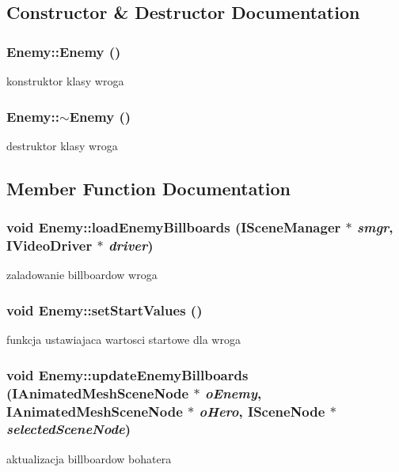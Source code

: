 \subsection{Constructor \& Destructor Documentation}
\hypertarget{class_enemy_a94f30d348b6d2840fd71675472ba38dd}{
\subsubsection[{Enemy}]{\setlength{\rightskip}{0pt plus 5cm}Enemy::Enemy ()}}
\label{class_enemy_a94f30d348b6d2840fd71675472ba38dd}
konstruktor klasy wroga \hypertarget{class_enemy_ac0eec4755e28c02688065f9657150ac3}{
\subsubsection[{$\sim$Enemy}]{\setlength{\rightskip}{0pt plus 5cm}Enemy::$\sim$Enemy ()}}
\label{class_enemy_ac0eec4755e28c02688065f9657150ac3}
destruktor klasy wroga 

\subsection{Member Function Documentation}
\hypertarget{class_enemy_a0ab9508df2fd67274909f58eb45bfe1d}{
\subsubsection[{loadEnemyBillboards}]{\setlength{\rightskip}{0pt plus 5cm}void Enemy::loadEnemyBillboards (ISceneManager $\ast$ {\em smgr}, \/  IVideoDriver $\ast$ {\em driver})}}
\label{class_enemy_a0ab9508df2fd67274909f58eb45bfe1d}
zaladowanie billboardow wroga \hypertarget{class_enemy_aadb12aa34b916fa9545f00c2000cbb89}{
\subsubsection[{setStartValues}]{\setlength{\rightskip}{0pt plus 5cm}void Enemy::setStartValues ()}}
\label{class_enemy_aadb12aa34b916fa9545f00c2000cbb89}
funkcja ustawiajaca wartosci startowe dla wroga \hypertarget{class_enemy_ad8e2fa7bfcea903de98517326f5c6517}{
\subsubsection[{updateEnemyBillboards}]{\setlength{\rightskip}{0pt plus 5cm}void Enemy::updateEnemyBillboards (IAnimatedMeshSceneNode $\ast$ {\em oEnemy}, \/  IAnimatedMeshSceneNode $\ast$ {\em oHero}, \/  ISceneNode $\ast$ {\em selectedSceneNode})}}
\label{class_enemy_ad8e2fa7bfcea903de98517326f5c6517}
aktualizacja billboardow bohatera 


